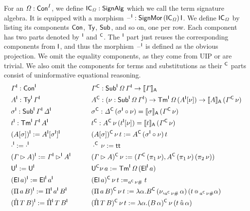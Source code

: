 \documentclass[a4paper,UKenglish,cleveref, autoref]{lipics-v2019}
\begin{document}
\begin{definition}
  For an $\mathit{\Omega}:\mathsf{Con}^I$, we define $\mathsf{IC}_{\mathit{\Omega}}:\mathsf{SignAlg}$ which we
  call the term signature algebra. It is equipped with a morphism
  $\mathord{\hspace{1pt}\text{--}\hspace{1pt}}^{\mathsf{I}} : \mathsf{SignMor}\,(\mathsf{IC}_{\mathit{\Omega}})\,\mathsf{I}$. We define $\mathsf{IC}_{\mathit{\Omega}}$
  by listing its components $\mathsf{Con}$, $\mathsf{Ty}$, $\mathsf{Sub}$, and so on, one per
  row. Each component has two parts denoted by $^{\mathsf{I}}$ and $^{\mathsf{C}}$. The
  $^{\mathsf{I}}$ part just reuses the corresponding components from $\mathsf{I}$, and
  thus the morphism $\mathord{\hspace{1pt}\text{--}\hspace{1pt}}^{\mathsf{I}}$ is defined as the obvious
  projection. We omit the equality components, as they come from UIP
  or are trivial. We also omit the components for terms and
  substitutions as their $^{\mathsf{C}}$ parts consist of uninformative equational
  reasoning.
  \begin{alignat*}{10}
    & \GG^\I:\Con^\I && \hspace{1em} && \GG^\C: \Sub^\I\,\GO\,\GG^\I\ra \ll\GG\rr_\A \\
    & A^\I:\Ty^\I\,\GG^\I && && A^\C:(\nu:\Sub^\I\,\GO\,\GG^\I)\ra\Tm^\I\,\GO\,(A^\I[\nu])\ra \ll A\rr_\A\,(\GG^\C\,\nu) \\
    & \sigma^\I:\Sub^\I\,\GG^\I\,\GD^\I && && \sigma^\C:\GD^\C\,(\sigma^\I\circ\nu)=\ll\sigma\rr_\A\,(\GG^\C\,\nu) \\
    & t^\I:\Tm^\I\,\GG^\I\,A^\I && && t^\C : A^\C\,\nu\,(t^\I[\nu])= \ll t\rr_\A\,(\GG^\C\,\nu) \\
    & (A[\sigma])^\I := A^\I[\sigma^\I]^\I && && (A[\sigma])^\C\,\nu\,t := A^\C\,(\sigma^\I\circ\nu)\,t \\
    & \cdot^\I := \cdot^\I && && \cdot^\C\,\nu := \tt \\
    & (\GG\rhd A)^\I := \GG^\I\rhd^\I A^\I && && (\GG\rhd A)^\C\,\nu := (\GG^\C\,(\pi_1\,\nu), A^\C\,(\pi_1\,\nu)\,(\pi_2\,\nu)) \\
    & \U^\I := \U^\I && && \U^\C\nu\,a := \Tm^\I\,\GO\,(\El^\I\,a) \\
    & (\El\,a)^\I := \El^\I\,a^\I && && (\El\,a)^\C\,\nu\,t := _{a^\C\,\nu\#}t \\
    & (\Pi\,a\,B)^\I := \Pi^\I\,a^\I\,B^\I && && (\Pi\,a\,B)^\C\,\nu\,t := \lambda\alpha.B^\C\,(\nu, _{a^\C\,\nu\#}\alpha)\,(t\oldapp {_{a^\C\,\nu\#}\alpha}) \\
    & (\Pim\,T\,B)^\I := \Pim^\I\,T\,B^\I && && (\Pim\,T\,B)^\C\,\nu\,t := \lambda\alpha.(B\,\alpha)^\C\,\nu\,(t\appm\alpha)
  \end{alignat*}
\end{definition}
\end{document}
